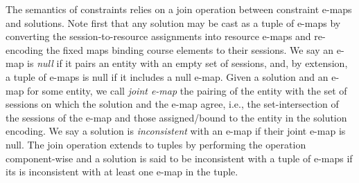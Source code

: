 The semantics of constraints relies on a join operation between constraint e-maps and solutions.
Note first that any solution may be cast as a tuple of e-maps 
by converting the session-to-resource assignments into resource e-maps
and re-encoding the fixed maps binding course elements to their sessions.
We say an e-map is \textit{null} if it pairs an entity with an empty set of sessions,
and, by extension, a tuple of e-maps is null if it includes a null e-map.
Given a solution and an e-map for some entity,
we call \textit{joint e-map} the pairing of the entity with the set of sessions
on which the solution and the e-map agree,
i.e., the set-intersection of the sessions of the e-map and those assigned/bound to the entity in the solution encoding.
We say a solution is \textit{inconsistent} with an e-map if their joint e-map is null.
The join operation extends to tuples by performing the operation component-wise
and a solution is said to be inconsistent with a tuple of e-maps 
if its is inconsistent with at least one e-map in the tuple.

